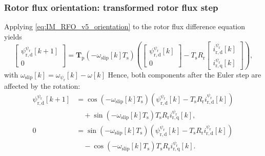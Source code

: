 \begin{frame}
    \frametitle{Rotor flux orientation: transformed rotor flux step}
    Applying \eqref{eq:IM_RFO_v5_orientation} to the rotor flux difference equation yields
    \begin{equation}
        \begin{bmatrix}\psi^{\psi_\mathrm{r}}_{\mathrm{r,d}}[k+1]\\0\end{bmatrix}
        =\bm{T}_\mathrm{p}(-\omega_\mathrm{slip}[k]T_\mathrm{s})
        \left(
        \begin{bmatrix}\psi^{\psi_\mathrm{r}}_{\mathrm{r,d}}[k]\\0\end{bmatrix}
        -T_\mathrm{s}R_\mathrm{r}
        \begin{bmatrix}i^{\psi_\mathrm{r}}_{\mathrm{r,d}}[k]\\i^{\psi_\mathrm{r}}_{\mathrm{r,q}}[k]\end{bmatrix}
        \right),
        \label{eq:IM_RFO_v5_rotor_flux_rotated}
    \end{equation}
    with $\omega_\mathrm{slip}[k]=\omega_{\psi_\mathrm{r}}[k]-\omega[k]$ \pause Hence, both components after the Euler step are affected by the rotation:
    \begin{equation}
        \begin{split}
            \psi^{\psi_\mathrm{r}}_{\mathrm{r,d}}[k+1]
              & =\cos(-\omega_\mathrm{slip}[k]T_\mathrm{s})
            \left(\psi^{\psi_\mathrm{r}}_{\mathrm{r,d}}[k]-T_\mathrm{s}R_\mathrm{r}i^{\psi_\mathrm{r}}_{\mathrm{r,d}}[k]\right) \\
              & \quad+\sin(-\omega_\mathrm{slip}[k]T_\mathrm{s})T_\mathrm{s}R_\mathrm{r}i^{\psi_\mathrm{r}}_{\mathrm{r,q}}[k],  \\
            0 & =\sin(-\omega_\mathrm{slip}[k]T_\mathrm{s})
            \left(\psi^{\psi_\mathrm{r}}_{\mathrm{r,d}}[k]-T_\mathrm{s}R_\mathrm{r}i^{\psi_\mathrm{r}}_{\mathrm{r,d}}[k]\right) \\
              & \quad-\cos(-\omega_\mathrm{slip}[k]T_\mathrm{s})T_\mathrm{s}R_\mathrm{r}i^{\psi_\mathrm{r}}_{\mathrm{r,q}}[k].
        \end{split}
        \label{eq:IM_RFO_v5_rotor_flux_components}
    \end{equation}
\end{frame}

